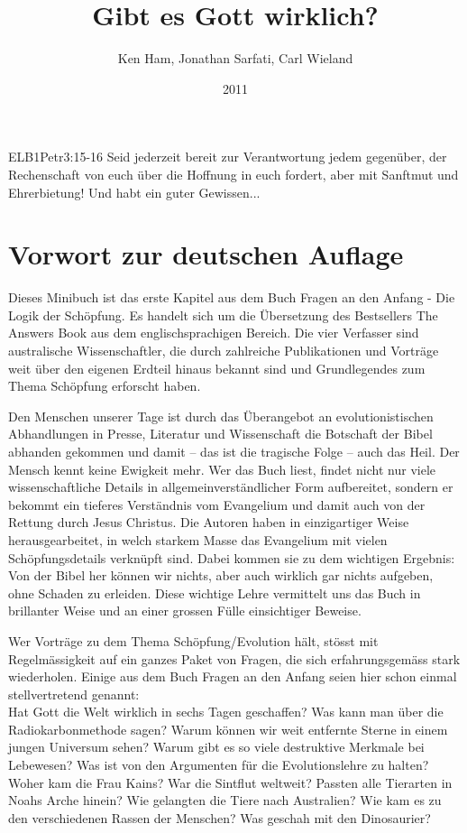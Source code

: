 \documentclass{../inc/mybib}
\title{Gibt es Gott wirklich?}
\author{Ken Ham, Jonathan Sarfati, Carl Wieland}
\date{2011}
\begin{document}
\maketitle
\begin{bibeltext}{ELB}{1Petr}{3:15-16}
    Seid jederzeit bereit zur Verantwortung jedem gegenüber, der Rechenschaft von euch über die Hoffnung in euch fordert, aber mit Sanftmut und Ehrerbietung! Und habt ein guter Gewissen...
\end{bibeltext}
\tableofcontents
\section{Vorwort zur deutschen Auflage}
Dieses Minibuch ist das erste Kapitel aus dem Buch \flqq Fragen an den Anfang - Die Logik der Schöpfung\frqq. Es handelt sich um die Übersetzung des Bestsellers \flqq The Answers Book\frqq{} aus dem englischsprachigen Bereich. Die vier Verfasser sind australische Wissenschaftler, die durch zahlreiche Publikationen und Vorträge weit über den eigenen Erdteil hinaus bekannt sind und Grundlegendes zum Thema Schöpfung erforscht haben.

Den Menschen unserer Tage ist durch das Überangebot an evolutionistischen Abhandlungen in Presse, Literatur und Wissenschaft die Botschaft der Bibel abhanden gekommen und damit -- das ist die tragische Folge -- auch das Heil. Der Mensch kennt keine Ewigkeit mehr. Wer das Buch liest, findet nicht nur viele wissenschaftliche Details in allgemeinverständlicher Form aufbereitet, sondern er bekommt ein tieferes Verständnis vom Evangelium und damit auch von der Rettung durch Jesus Christus. Die Autoren haben in einzigartiger Weise herausgearbeitet, in welch starkem Masse das Evangelium mit vielen Schöpfungsdetails verknüpft sind. Dabei kommen sie zu dem wichtigen Ergebnis: Von der Bibel her können wir nichts, aber auch wirklich gar nichts aufgeben, ohne Schaden zu erleiden. Diese wichtige Lehre vermittelt uns das Buch in brillanter Weise und an einer grossen Fülle einsichtiger Beweise.

Wer Vorträge zu dem Thema Schöpfung/Evolution hält, stösst mit Regelmässigkeit auf ein ganzes Paket von Fragen, die sich erfahrungsgemäss stark wiederholen. Einige aus dem Buch \flqq Fragen an den Anfang\frqq{} seien hier schon einmal stellvertretend genannt:\\
Hat Gott die Welt wirklich in sechs Tagen geschaffen? Was kann man über die Radiokarbonmethode sagen? Warum können wir weit entfernte Sterne in einem jungen Universum sehen? Warum gibt es so viele destruktive Merkmale bei Lebewesen? Was ist von den Argumenten für die Evolutionslehre zu halten? Woher kam die Frau Kains? War die Sintflut weltweit? Passten alle Tierarten in Noahs Arche hinein? Wie gelangten die Tiere nach Australien? Wie kam es zu den verschiedenen Rassen der Menschen? Was geschah mit den Dinosaurier?
\end{document}
